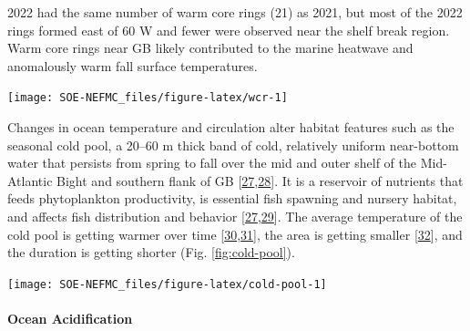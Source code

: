 \documentclass[
  10pt,
]{article}
\let\origfigure\figure
\let\endorigfigure\endfigure
\renewenvironment{figure}[1][2] {
    \expandafter\origfigure\expandafter[H]
} {
    \endorigfigure
}
\begin{document}
2022 had the same number of warm core rings (21) as 2021, but most of the 2022 rings formed east of 60 W and fewer were observed near the shelf break region. Warm core rings near GB likely contributed to the marine heatwave and anomalously warm fall surface temperatures.

\begin{figure}

{\centering \texttt{[image: SOE-NEFMC\_files/figure-latex/wcr-1]} 

}

\caption{Warm core ring formation on the Northeast U.S. Shelf: Annual number of rings.  A significant regime shift is denoted by the split red line as noted in Gangopadhyay et al. 2019.}\label{fig:wcr}
\end{figure}

Changes in ocean temperature and circulation alter habitat features such as the seasonal cold pool, a 20--60 m thick band of cold, relatively uniform near-bottom water that persists from spring to fall over the mid and outer shelf of the Mid-Atlantic Bight and southern flank of GB {[}\protect\hyperlink{ref-lentz_seasonal_2017}{27},\protect\hyperlink{ref-chen_seasonal_2018}{28}{]}. It is a reservoir of nutrients that feeds phytoplankton productivity, is essential fish spawning and nursery habitat, and affects fish distribution and behavior {[}\protect\hyperlink{ref-lentz_seasonal_2017}{27},\protect\hyperlink{ref-miles_offshore_2021}{29}{]}. The average temperature of the cold pool is getting warmer over time {[}\protect\hyperlink{ref-miller_state-space_2016}{30},\protect\hyperlink{ref-du_pontavice_incorporating_nodate}{31}{]}, the area is getting smaller {[}\protect\hyperlink{ref-friedland_middle_2022}{32}{]}, and the duration is getting shorter (Fig. \ref{fig:cold-pool}).

\begin{figure}

{\centering \texttt{[image: SOE-NEFMC\_files/figure-latex/cold-pool-1]} 

}

\caption{Seasonal cold pool indices: mean temperature within the cold pool, cold pool persistence, and spatial extent.}\label{fig:cold-pool}
\end{figure}

\hypertarget{ocean-acidification}{%
\paragraph{Ocean Acidification}\label{ocean-acidification}}
\end{document}
